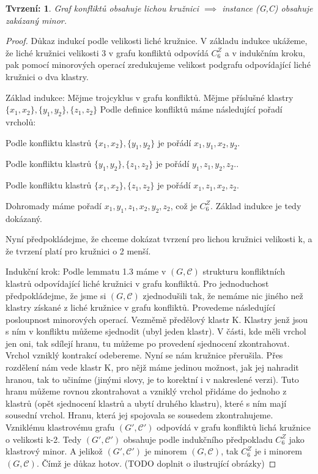 \documentclass[12pt,a4report]{report}
\newtheorem{tvr}{Tvrzení: }[chapter]
\begin{document}
\begin{tvr}
Graf konfliktů obsahuje lichou kružnici $\implies$ instance (G,C) obsahuje zakázaný minor.
\end{tvr}
\begin{proof}
Důkaz indukcí podle velikosti liché kružnice. V základu indukce ukážeme, že liché kružnici velikosti 3 v grafu konfliktů odpovídá $C_6^Z$ a v indukčním kroku, pak pomocí minorových operací zredukujeme velikost podgrafu odpovídající liché kružnici o dva klastry. 

Základ indukce: Mějme trojcyklus v grafu konfliktů. Mějme příslušné klastry $\{x_1, x_2\},\{y_1, y_2\},\{z_1, z_2\}$ Podle definice konfliktů máme následující pořadí vrcholů:

Podle konfliktu klastrů $\{x_1, x_2\},\{y_1, y_2\}$ je pořádí $x_1, y_1, x_2, y_2$.

Podle konfliktu klastrů $\{y_1, y_2\},\{z_1, z_2\}$ je pořádí $y_1, z_1, y_2, z_2.$.

Podle konfliktu klastrů $\{x_1, x_2\},\{z_1, z_2\}$ je pořádí $x_1, z_1, x_2, z_2$.

Dohromady máme pořadí $x_1, y_1, z_1, x_2, y_2, z_2$, což je $C_6^Z$. Základ indukce je tedy dokázaný.

Nyní předpokládejme, že chceme dokázat tvrzení pro lichou kružnici velikosti k, a že tvrzení platí pro kružnici o 2 menší.

Indukční krok: Podle lemmatu 1.3 máme v $(G,\mathcal C)$ strukturu konfliktních klastrů odpovídající liché kružnici v grafu konfliktů. Pro jednoduchost předpokládejme, že jsme si $(G,\mathcal C)$ zjednodušili tak, že nemáme nic jiného než klastry získané z liché kružnice v grafu konfliktů. Provedeme následující posloupnost minorových operací. Vezměmě předělový klastr K. Klastry jenž jsou s ním v konfliktu můžeme sjednodit (ubyl jeden klastr). V části, kde měli vrchol jen oni, tak sdílejí hranu, tu můžeme po provedení sjednocení zkontrahovat. Vrchol vzniklý kontrakcí odebereme. Nyní se nám kružnice přerušila. Přes rozdělení nám vede klastr K, pro nějž máme jedinou možnost, jak jej nahradit hranou, tak to učiníme (jinými slovy, je to korektní i v nakreslené verzi). Tuto hranu můžeme rovnou zkontrahovat a vzniklý vrchol přidáme do jednoho z klastrů (opět sjednocení klastrů a ubytí druhého klastru), které s ním mají sousední vrchol. Hranu, která jej spojovala se sousedem zkontrahujeme.  Vzniklému klastrovému grafu $(G',\mathcal C')$ odpovídá v grafu konfliktů lichá kružnice o velikosti k-2. Tedy $(G',\mathcal C')$ obsahuje podle indukčního předpokladu $C_6^Z$ jako klastrový minor. A jelikož $(G',\mathcal C')$ je minorem $(G,\mathcal C)$, tak $C_6^Z$ je i minorem $(G,\mathcal C)$. Čímž je důkaz hotov. (TODO doplnit o ilustrující obrázky)
\end{proof}
\end{document}
